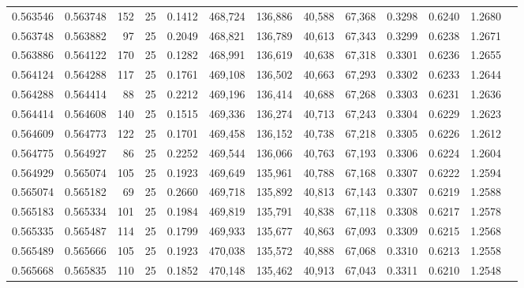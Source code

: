 \begin{tabular}{rrrrrrrrrrrrr}
0.563546 & 0.563748 &   152 &  25 &                                     0.1412 & 468,724 & 136,886 &  40,588 &  67,368 & 0.3298 & 0.6240 & 1.2680 \\
0.563748 & 0.563882 &    97 &  25 &                                     0.2049 & 468,821 & 136,789 &  40,613 &  67,343 & 0.3299 & 0.6238 & 1.2671 \\
0.563886 & 0.564122 &   170 &  25 &                                     0.1282 & 468,991 & 136,619 &  40,638 &  67,318 & 0.3301 & 0.6236 & 1.2655 \\
0.564124 & 0.564288 &   117 &  25 &                                     0.1761 & 469,108 & 136,502 &  40,663 &  67,293 & 0.3302 & 0.6233 & 1.2644 \\
0.564288 & 0.564414 &    88 &  25 &                                     0.2212 & 469,196 & 136,414 &  40,688 &  67,268 & 0.3303 & 0.6231 & 1.2636 \\
0.564414 & 0.564608 &   140 &  25 &                                     0.1515 & 469,336 & 136,274 &  40,713 &  67,243 & 0.3304 & 0.6229 & 1.2623 \\
0.564609 & 0.564773 &   122 &  25 &                                     0.1701 & 469,458 & 136,152 &  40,738 &  67,218 & 0.3305 & 0.6226 & 1.2612 \\
0.564775 & 0.564927 &    86 &  25 &                                     0.2252 & 469,544 & 136,066 &  40,763 &  67,193 & 0.3306 & 0.6224 & 1.2604 \\
0.564929 & 0.565074 &   105 &  25 &                                     0.1923 & 469,649 & 135,961 &  40,788 &  67,168 & 0.3307 & 0.6222 & 1.2594 \\
0.565074 & 0.565182 &    69 &  25 &                                     0.2660 & 469,718 & 135,892 &  40,813 &  67,143 & 0.3307 & 0.6219 & 1.2588 \\
0.565183 & 0.565334 &   101 &  25 &                                     0.1984 & 469,819 & 135,791 &  40,838 &  67,118 & 0.3308 & 0.6217 & 1.2578 \\
0.565335 & 0.565487 &   114 &  25 &                                     0.1799 & 469,933 & 135,677 &  40,863 &  67,093 & 0.3309 & 0.6215 & 1.2568 \\
0.565489 & 0.565666 &   105 &  25 &                                     0.1923 & 470,038 & 135,572 &  40,888 &  67,068 & 0.3310 & 0.6213 & 1.2558 \\
0.565668 & 0.565835 &   110 &  25 &                                     0.1852 & 470,148 & 135,462 &  40,913 &  67,043 & 0.3311 & 0.6210 & 1.2548 \\

\end{tabular}
